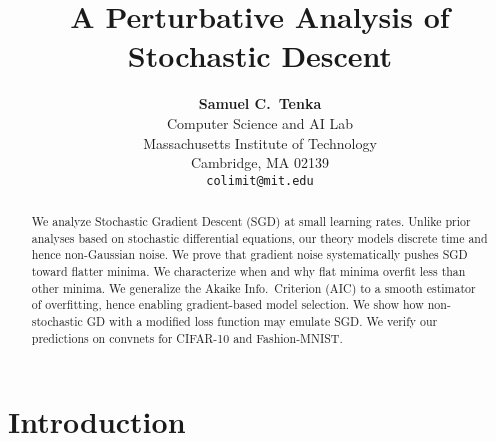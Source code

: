 \documentclass{article}
\title{%
    A Perturbative Analysis of Stochastic Descent
}
\author{%
    \textbf{Samuel C.~Tenka} \\
    Computer Science and AI Lab \\
    Massachusetts Institute of Technology \\
    Cambridge, MA 02139 \\
    \texttt{colimit@mit.edu}
}
\theoremstyle{plain}
\theoremstyle{definition}
\begin{document}
    \maketitle
    
    
    \begin{abstract}
        We analyze Stochastic Gradient Descent (SGD) at small learning rates.
        Unlike prior analyses based on stochastic differential equations, our
        theory models discrete time and hence non-Gaussian noise.
        We prove that gradient noise systematically pushes SGD toward flatter
        minima.  We characterize when and why flat minima overfit less than
        other minima.  We generalize the Akaike Info.\ Criterion (AIC) to a
        smooth estimator of overfitting, hence enabling gradient-based model
        selection.  We show how non-stochastic GD with a modified loss function
        may emulate SGD.
        We verify our predictions on convnets for CIFAR-10 and Fashion-MNIST.
    \end{abstract}
    

\section{Introduction}


\end{document}
